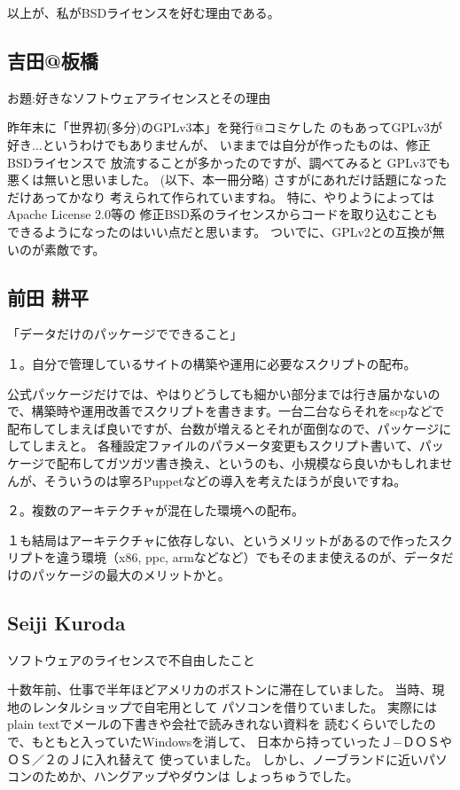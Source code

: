 \documentclass[mingoth,a4paper]{jsarticle}
\begin{document}
\begin{multicols}{2}
{以上が、私がBSDライセンスを好む理由である。

\subsection{吉田@板橋}


お題:好きなソフトウェアライセンスとその理由

昨年末に「世界初(多分)のGPLv3本」を発行@コミケした
のもあってGPLv3が好き...というわけでもありませんが、
いままでは自分が作ったものは、修正BSDライセンスで
放流することが多かったのですが、調べてみると
GPLv3でも悪くは無いと思いました。
(以下、本一冊分略)
さすがにあれだけ話題になっただけあってかなり
考えられて作られていますね。
特に、やりようによってはApache License 2.0等の
修正BSD系のライセンスからコードを取り込むことも
できるようになったのはいい点だと思います。
ついでに、GPLv2との互換が無いのが素敵です。

\subsection{前田 耕平}



「データだけのパッケージでできること」

１。自分で管理しているサイトの構築や運用に必要なスクリプトの配布。

公式パッケージだけでは、やはりどうしても細かい部分までは行き届かないので、構築時や運用改善でスクリプトを書きます。一台二台ならそれをscpなどで配布してしまえば良いですが、台数が増えるとそれが面倒なので、パッケージにしてしまえと。
各種設定ファイルのパラメータ変更もスクリプト書いて、パッケージで配布してガツガツ書き換え、というのも、小規模なら良いかもしれませんが、そういうのは寧ろPuppetなどの導入を考えたほうが良いですね。

２。複数のアーキテクチャが混在した環境への配布。

１も結局はアーキテクチャに依存しない、というメリットがあるので作ったスクリプトを違う環境（x86, ppc,
armなどなど）でもそのまま使えるのが、データだけのパッケージの最大のメリットかと。

\subsection{Seiji Kuroda}


ソフトウェアのライセンスで不自由したこと

十数年前、仕事で半年ほどアメリカのボストンに滞在していました。
当時、現地のレンタルショップで自宅用として
パソコンを借りていました。
実際にはplain textでメールの下書きや会社で読みきれない資料を
読むくらいでしたので、もともと入っていたWindowsを消して、
日本から持っていったＪ−ＤＯＳやＯＳ／２のＪに入れ替えて
使っていました。
しかし、ノーブランドに近いパソコンのためか、ハングアップやダウンは
しょっちゅうでした。

}
\end{multicols}
\end{document}
